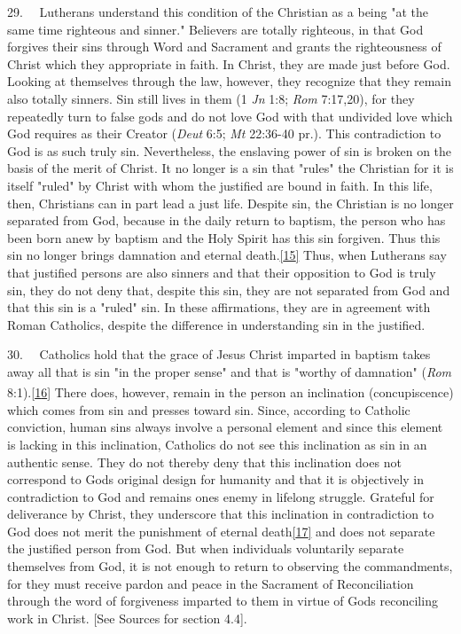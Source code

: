 29.~ ~Lutherans understand this condition of the Christian as a being
"at the same time righteous and sinner." Believers are totally
righteous, in that God forgives their sins through Word and Sacrament
and grants the righteousness of Christ which they appropriate in faith.
In Christ, they are made just before God. Looking at themselves through
the law, however, they recognize that they remain also totally sinners.
Sin still lives in them (1 \emph{Jn} 1:8; \emph{Rom} 7:17,20), for they
repeatedly turn to false gods and do not love God with that undivided
love which God requires as their Creator (\emph{Deut} 6:5; \emph{Mt}
22:36-40 pr.). This contradiction to God is as such truly sin.
Nevertheless, the enslaving power of sin is broken on the basis of the
merit of Christ. It no longer is a sin that "rules" the Christian for it
is itself "ruled" by Christ with whom the justified are bound in faith.
In this life, then, Christians can in part lead a just life. Despite
sin, the Christian is no longer separated from God, because in the daily
return to baptism, the person who has been born anew by baptism and the
Holy Spirit has this sin forgiven. Thus this sin no longer brings
damnation and eternal
death.\label{r15}{}\hyperref[15]{{[}15{]}} Thus, when
Lutherans say that justified persons are also sinners and that their
opposition to God is truly sin, they do not deny that, despite this sin,
they are not separated from God and that this sin is a "ruled" sin. In
these affirmations, they are in agreement with Roman Catholics, despite
the difference in understanding sin in the justified.

30.~ ~Catholics hold that the grace of Jesus Christ imparted in baptism
takes away all that is sin "in the proper sense" and that is "worthy of
damnation" (\emph{Rom}
8:1).\label{r16}{}\hyperref[16]{{[}1}\hyperref[16]{6}\hyperref[16]{{]}}
\textsuperscript{} There does, however, remain in the person an
inclination (concupiscence) which comes from sin and presses toward sin.
Since, according to Catholic conviction, human sins always involve a
personal element and since this element is lacking in this inclination,
Catholics do not see this inclination as sin in an authentic sense. They
do not thereby deny that this inclination does not correspond to
God\textquotesingle s original design for humanity and that it is
objectively in contradiction to God and remains one\textquotesingle s
enemy in lifelong struggle. Grateful for deliverance by Christ, they
underscore that this inclination in contradiction to God does not merit
the punishment of eternal
death\label{r17}{}\hyperref[17]{{[}17{]}} and does not
separate the justified person from God. But when individuals voluntarily
separate themselves from God, it is not enough to return to observing
the commandments, for they must receive pardon and peace in the
Sacrament of Reconciliation through the word of forgiveness imparted to
them in virtue of God\textquotesingle s reconciling work in Christ.
{[}See Sources for section 4.4{]}.

